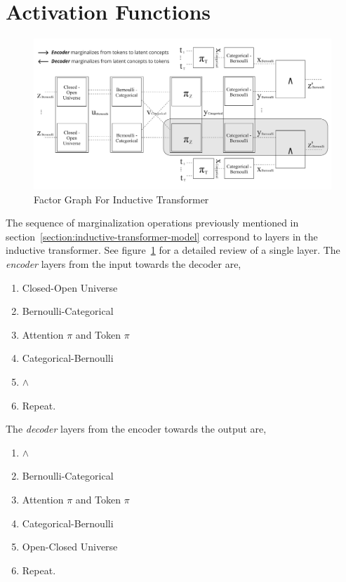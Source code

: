 \documentclass{article}
\begin{document}
\section{Activation Functions}\label{appendix:activation-functions}

\begin{figure}[H]
    \centering
    \includegraphics[width=\textwidth]{figures/transformer_factor_graph.pdf}
    \caption{Factor Graph For Inductive Transformer}
    \label{fig-appendix:factor-graph-for-inductive-transformer}
\end{figure}

The sequence of marginalization operations previously mentioned in section~\ref{section:inductive-transformer-model} correspond to layers in the inductive transformer. See figure~\ref{fig-appendix:factor-graph-for-inductive-transformer} for a detailed review of a single layer.
 The \emph{encoder} layers from the input towards the decoder are,
 
\begin{enumerate}
    \setlength\itemsep{0em}
    \item Closed-Open Universe
    \item Bernoulli-Categorical
    \item Attention $\pi$ and Token $\pi$
    \item Categorical-Bernoulli
    \item $\land$
    \item Repeat.
\end{enumerate}

The \emph{decoder} layers from the encoder towards the output are,
\begin{enumerate}
    \setlength\itemsep{0em}
    \item $\land$
    \item Bernoulli-Categorical
    \item Attention $\pi$ and Token $\pi$
    \item Categorical-Bernoulli
    \item Open-Closed Universe
    \item Repeat.
\end{enumerate}
\end{document}
